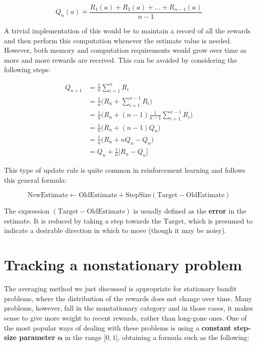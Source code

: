 \begin{equation*}
    Q_n(a) \doteq \frac{R_1(a) + R_2(a) + ... + R_{n-1}(a)}{n-1}
\end{equation*}

A trivial implementation of this would be to maintain a record of all the rewards and then perform this computation whenever the estimate value is needed. However, both memory and computation requirements would grow over time as more and more rewards are received. This can be avoided by considering the following steps:

\begin{equation*}
    \begin{split}
        Q_{n+1} & = \frac{1}{n} \sum_{i=1}^{n} R_i\\
        & = \frac{1}{n} \Big( R_n + \sum_{i=1}^{n-1} R_i \Big) \\
        & = \frac{1}{n} \Big( R_n + (n-1) \frac{1}{n-1} \sum_{i=1}^{n-1} R_i \Big) \\
        & = \frac{1}{n} \Big( R_n + (n-1) Q_n \Big) \\
        & = \frac{1}{n} \Big( R_n + n Q_n - Q_n \Big) \\
        & = Q_n + \frac{1}{n} \Big[R_n - Q_n \Big]
    \end{split}
\end{equation*}

This type of update rule is quite common in reinforcement learning and follows this general formula:

\begin{equation}
    \text{NewEstimate} \leftarrow \text{OldEstimate} + \text{StepSize}(\text{Target} - \text{OldEstimate})
    \label{eq:ch3-generalrlupdaterule}
\end{equation}

The expression $(\text{Target} - \text{OldEstimate})$ is usually defined as the \textbf{error} in the estimate. It is reduced by taking a step towards the $\text{Target}$, which is presumed to indicate a desirable direction in which to move (though it may be noisy).

\section{Tracking a nonstationary problem}
The averaging method we just discussed is appropriate for stationary bandit problems, where the distribution of the rewards does not change over time. Many problems, however, fall in the nonstationary category and in those cases, it makes sense to give more weight to recent rewards, rather than long-gone ones. One of the most popular ways of dealing with these problems is using a \textbf{constant step-size parameter} $\boldsymbol{\alpha}$ in the range $]0,1]$, obtaining a formula such as the following:

